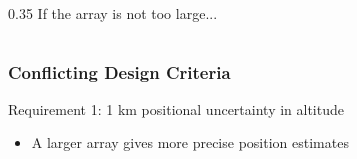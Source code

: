 \begin{frame}[label=change_spec]
\begin{columns}[T]
\begin{column}{0.35\textwidth}
{            \footnotesize *If the array is not too large...}           
        \end{column}
    \end{columns}
\end{frame}

\begin{frame}
    \frametitle{Conflicting Design Criteria}
    Requirement 1: \alert{1 km positional uncertainty in altitude}
    \begin{itemize}
        \item[\(\blacktriangleright\)] A larger array gives more precise position estimates 
    \end{itemize}


    \centering
\end{frame}